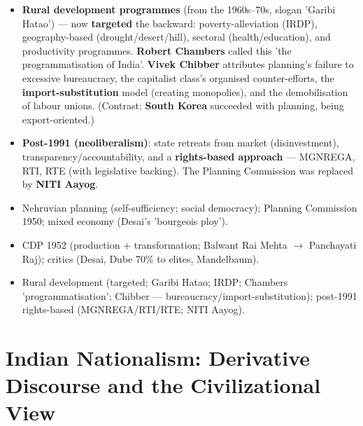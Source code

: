 \begin{KeyConcept}
\begin{itemize}
\item \textbf{Rural development programmes} (from the 1960s--70s, slogan 'Garibi Hatao') --- now \textbf{targeted} the backward: poverty-alleviation (IRDP), geography-based (drought/desert/hill), sectoral (health/education), and productivity programmes. \textbf{Robert Chambers} called this 'the programmatisation of India'. \textbf{Vivek Chibber} attributes planning's failure to excessive bureaucracy, the capitalist class's organised counter-efforts, the \textbf{import-substitution} model (creating monopolies), and the demobilisation of labour unions. (Contrast: \textbf{South Korea} succeeded with planning, being export-oriented.)
\item \textbf{Post-1991 (neoliberalism)}: state retreats from market (disinvestment), transparency/accountability, and a \textbf{rights-based approach} --- MGNREGA, RTI, RTE (with legislative backing). The Planning Commission was replaced by \textbf{NITI Aayog}.
\end{itemize}
\end{KeyConcept}

\begin{QuickRevision}
\begin{itemize}
\item Nehruvian planning (self-sufficiency; social democracy); Planning Commission 1950; mixed economy (Desai's 'bourgeois ploy').
\item CDP 1952 (production + transformation; Balwant Rai Mehta $\rightarrow$ Panchayati Raj); critics (Desai, Dube 70\% to elites, Mandelbaum).
\item Rural development (targeted; Garibi Hatao; IRDP; Chambers 'programmatisation'; Chibber --- bureaucracy/import-substitution); post-1991 rights-based (MGNREGA/RTI/RTE; NITI Aayog).
\end{itemize}
\end{QuickRevision}

\section{Indian Nationalism: Derivative Discourse and the Civilizational View}

